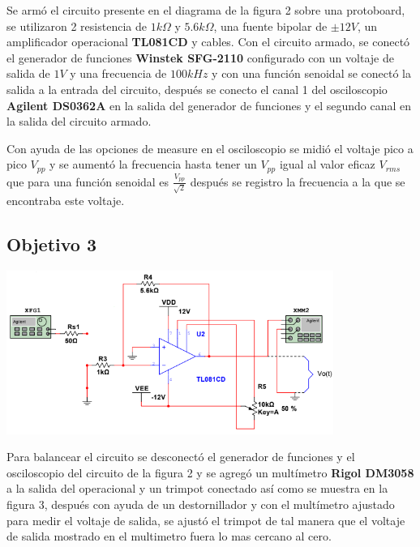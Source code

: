 \documentclass[DIV=calc, paper=a4, fontsize=11pt]{scrartcl}
\newenvironment{Figura}
  {\par\medskip\noindent\minipage{\linewidth}}
  {\endminipage\par\medskip}
\begin{document}
\begin{multicols}{2}
Se armó el circuito presente en el diagrama de la figura 2 sobre una protoboard, se utilizaron 2 resistencia de $1k\Omega$ y $5.6k \Omega$, una fuente bipolar de $\pm 12V$, un amplificador operacional \textbf{TL081CD} y cables. Con el circuito armado, se conectó el generador de funciones \textbf{Winstek SFG-2110} configurado con un voltaje de salida de $1V$ y una frecuencia de $100kHz$ y con una función senoidal se conectó la salida a la entrada del circuito, después se conecto el canal 1 del osciloscopio \textbf{Agilent DS0362A} en la salida del generador de funciones y el segundo canal en la salida del circuito armado. 

Con ayuda de las opciones de measure en el osciloscopio se midió el voltaje pico a pico $V_{pp}$ y se aumentó la frecuencia hasta tener un $V_{pp}$ igual al valor eficaz $V_{rms}$ que para una función senoidal es $\frac{V_{pp}}{\sqrt{2}}$ después se registro la frecuencia a la que se encontraba este voltaje. 

\subsection*{Objetivo 3}

\begin{Figura}
    \centering
    \includegraphics[width=0.8\textwidth]{diagramas/diagrama objetivo 2.1.PNG}
    \label{fig}
\end{Figura}

Para balancear el circuito se desconectó el generador de funciones y el osciloscopio del circuito de la figura 2 y se agregó un multímetro \textbf{Rigol DM3058} a la salida del operacional y un trimpot conectado así como se muestra en la figura 3, después con ayuda de un destornillador y con el multímetro ajustado para medir el voltaje de salida, se ajustó el trimpot de tal manera que el voltaje de salida mostrado en el multimetro fuera lo mas cercano al cero.


\end{multicols}
\end{document}
